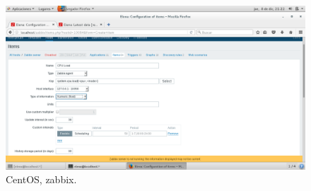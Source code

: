\begin{figure}[H] 
	\centering
	\includegraphics[width=14.7cm]{./img/opcional4_6.png} 	
	\caption{CentOS, zabbix.} \label{fig:opcional4_6}
\end{figure}










